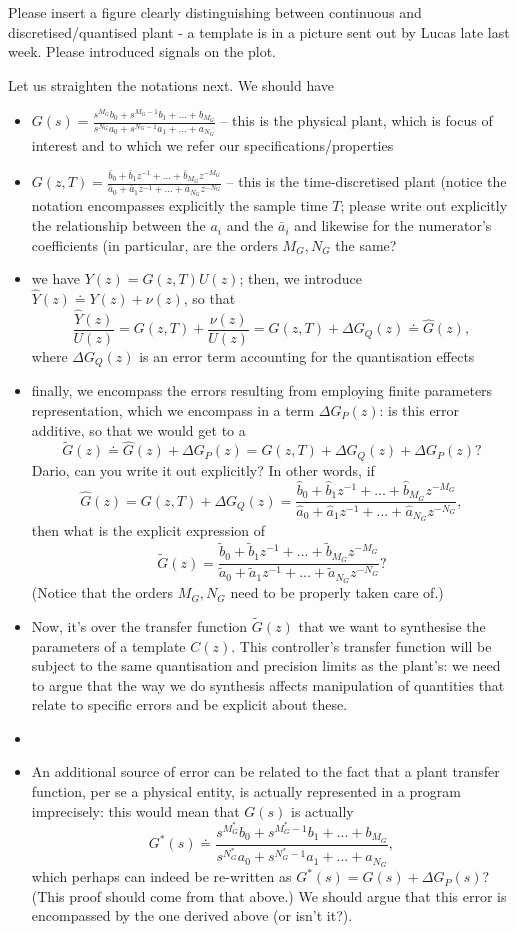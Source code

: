 \documentclass{sig-alternate-05-2015}
\newcommand{\blue}[1]{{\color{blue}#1}}
\begin{document}
\blue{Please insert a figure clearly distinguishing between continuous and discretised/quantised plant - a template is in a picture sent out by Lucas late last week. Please introduced signals on the plot. 

Let us straighten the notations next. 
We should have 
\begin{itemize}
\item 
$G(s) = \frac{s^{M_G}b_{0}+s^{M_G-1}b_{1}+...+b_{M_G}}{s^{N_G}a_{0}+s^{N_G-1}a_{1}+...+a_{N_G}}$ -- this is the physical plant, which is focus of interest and to which we refer our specifications/properties 
\item 
$G(z, T) = \frac{\bar b_{0}+\bar b_{1}z^{-1}+...+\bar b_{M_G}z^{-M_G}}{\bar a_{0}+\bar a_{1}z^{-1}+...+\bar a_{N_G}z^{-N_G}}$ -- this is the time-discretised plant (notice the notation encompasses explicitly the sample time $T$; please write out explicitly the relationship between the $a_i$ and the $\bar a_i$ and likewise for the numerator's coefficients 
(in particular, are the orders $M_G, N_G$ the same? 
\item 
we have $Y(z) = G(z,T) U(z)$; then, we introduce $\hat Y(z) \doteq Y(z) + \nu (z)$, so that 
$$
\frac{\hat Y(z)}{U(z)} = G(z,T) + \frac{\nu (z)}{U(z)} = G(z,T) + \Delta G_Q(z) \doteq \hat G(z) ,  
$$ 
where $\Delta G_Q(z)$ is an error term accounting for the quantisation effects 
\item 
finally, we encompass the errors resulting from employing finite parameters representation, 
which we encompass in a term $\Delta G_P(z)$: is this error additive, so that we would get to a 
$$
\tilde G(z) \doteq \hat G(z) + \Delta G_P(z) = G(z,T) + \Delta G_Q(z) + \Delta G_P(z)?  
$$ 
Dario, can you write it out explicitly? In other words, if 
$$
\hat G(z) = G(z,T) + \Delta G_Q(z) = \frac{\hat b_{0}+\hat b_{1}z^{-1}+...+\hat b_{M_G}z^{-M_G}}{\hat a_{0}+\hat a_{1}z^{-1}+...+\hat a_{N_G}z^{-N_G}},  
$$ 
then what is the explicit expression of 
$$
\tilde G(z) = \frac{\tilde b_{0}+\tilde b_{1}z^{-1}+...+\tilde b_{M_G}z^{-M_G}}{\tilde a_{0}+\tilde a_{1}z^{-1}+...+\tilde a_{N_G}z^{-N_G}}?
$$
(Notice that the orders $M_G, N_G$ need to be properly taken care of.)
\item 
Now, it's over the transfer function $\tilde G(z)$ that we want to synthesise the parameters of a template $C(z)$. 
This controller's transfer function will be subject to the same quantisation and precision limits as the plant's: 
we need to argue that the way we do synthesis affects manipulation of quantities that relate to specific errors and be explicit about these. 
\item[]
\item 
An additional source of error can be related to the fact that a plant transfer function, 
per se a physical entity, is actually represented in a program imprecisely: 
this would mean that $G(s)$ is actually 
$$
G^\ast (s) \doteq \frac{s^{M_G^\ast}b_{0}+s^{M_G^\ast-1}b_{1}+...+b_{M_G}}{s^{N_G^\ast}a_{0}+s^{N_G^\ast-1}a_{1}+...+a_{N_G}}, 
$$ 
which perhaps can indeed be re-written as $G^\ast (s) = G(s) + \Delta G_P(s)$? (This proof should come from that above.) 
We should argue that this error is encompassed by the one derived above (or isn't it?). 
\end{itemize}
}
\end{document}
